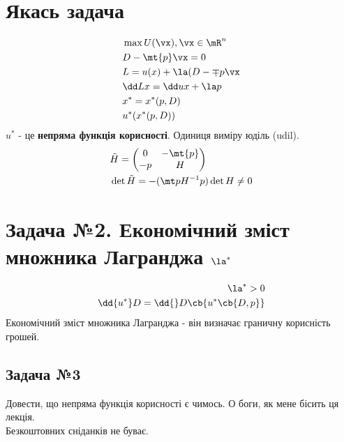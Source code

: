 \section{Якась задача} 
\begin{eqnarray}
&\max U(\vx),\vx\in\mR^n\\
&D - \mt{p}\vx = 0\\
&L = u(x) +\la(D-\mp{p}\vx\\
&\dd Lx = \dd ux + \la p\\
&x^* = x^*(p,D)\\
&u^*(x^*(p,D))
\end{eqnarray}
$u^*$ - це \textbf{непряма функція корисності}. Одиниця виміру юділь (udil).
\begin{eqnarray}
&\tilde{H}=\begin{pmatrix}
0 & -\mt{p}\\
-p & H
\end{pmatrix}\\
&\det \tilde{H} = -(\mt p H^{-1} p) \det H\neq 0
\end{eqnarray}
\section{Задача №2. Економічний зміст множника Лагранджа $\la^*$}
\begin{eqnarray}
\la^*>0 \\
\dd{u^*}D = \dd{}D\cb{u^*\cb{D,p}}
\end{eqnarray}
Економічний зміст множника Лагранджа - він визначає граничну корисність грошей.
\subsection{Задача №3}
Довести, що непряма функція корисності є чимось. О боги, як мене бісить ця лекція.\\
Безкоштовних сніданків не буває.